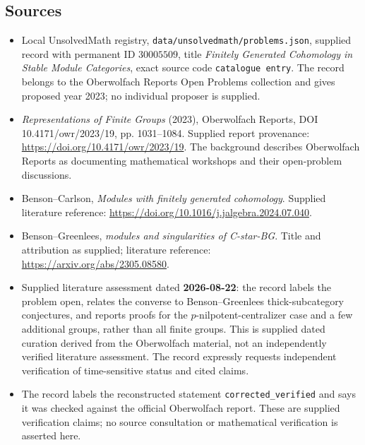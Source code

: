 \documentclass[11pt]{article}
\begin{document}
\subsection{Sources}
\begin{itemize}
\item Local UnsolvedMath registry, \texttt{data/unsolvedmath/problems.json}, supplied record with permanent ID \(30005509\), title \emph{Finitely Generated Cohomology in Stable Module Categories}, exact source code \texttt{catalogue entry}. The record belongs to the Oberwolfach Reports Open Problems collection and gives proposed year 2023; no individual proposer is supplied.
\item \emph{Representations of Finite Groups} (2023), Oberwolfach Reports, DOI 10.4171/owr/2023/19, pp. 1031--1084. Supplied report provenance: \url{https://doi.org/10.4171/owr/2023/19}. The background describes Oberwolfach Reports as documenting mathematical workshops and their open-problem discussions.
\item Benson--Carlson, \emph{Modules with finitely generated cohomology}. Supplied literature reference: \url{https://doi.org/10.1016/j.jalgebra.2024.07.040}.
\item Benson--Greenlees, \emph{modules and singularities of C-star-BG}. Title and attribution as supplied; literature reference: \url{https://arxiv.org/abs/2305.08580}.
\item Supplied literature assessment dated \textbf{2026-08-22}: the record labels the problem open, relates the converse to Benson--Greenlees thick-subcategory conjectures, and reports proofs for the \(p\)-nilpotent-centralizer case and a few additional groups, rather than all finite groups. This is supplied dated curation derived from the Oberwolfach material, not an independently verified literature assessment. The record expressly requests independent verification of time-sensitive status and cited claims.
\item The record labels the reconstructed statement \texttt{corrected\_verified} and says it was checked against the official Oberwolfach report. These are supplied verification claims; no source consultation or mathematical verification is asserted here.
\end{itemize}
\end{document}
